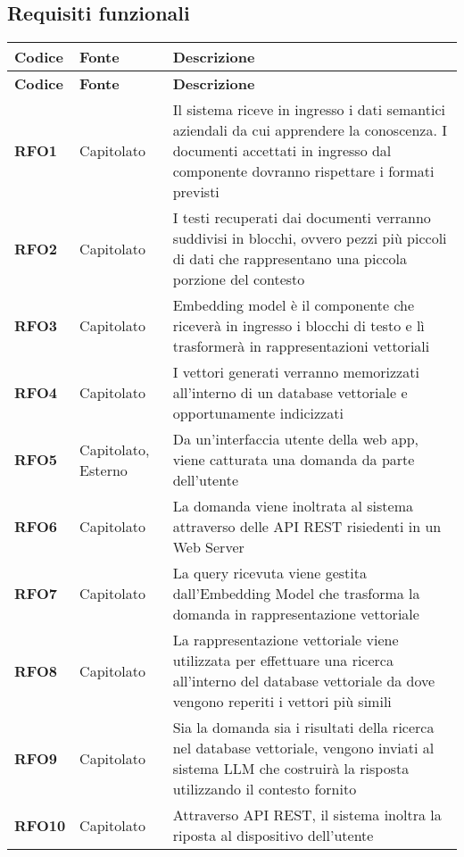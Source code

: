 \subsection{Requisiti funzionali}
\begin{longtable}{|>{\centering\arraybackslash}m{}|>{\centering\arraybackslash}m{}|>{\arraybackslash}m{}|}
	\hline
	\textbf{Codice} & \textbf{Fonte} & \textbf{Descrizione}\\\hline
	\endfirsthead
	\hline
	\textbf{Codice} & \textbf{Fonte} & \textbf{Descrizione}\\\hline
	\endhead
	\hline
	\textbf{RFO1}            & Capitolato    & Il sistema riceve in ingresso i dati semantici aziendali da cui apprendere la conoscenza. I documenti accettati in ingresso dal componente dovranno rispettare i formati previsti \\
	\hline
	\textbf{RFO2} & Capitolato & I testi recuperati dai documenti verranno suddivisi in blocchi, ovvero pezzi più piccoli di dati che rappresentano una piccola porzione del contesto\\
	\hline
	\textbf{RFO3} & Capitolato & Embedding model è il componente che riceverà in ingresso i blocchi di testo e lì trasformerà in rappresentazioni vettoriali\\
	\hline
	\textbf{RFO4} & Capitolato & I vettori generati verranno memorizzati all’interno di un database vettoriale e opportunamente indicizzati\\
	\hline
	\textbf{RFO5} & Capitolato, Esterno & Da un’interfaccia utente della web app, viene catturata una domanda da parte dell’utente\\
	\hline
	\textbf{RFO6} & Capitolato & La domanda viene inoltrata al sistema attraverso delle API REST risiedenti in un Web Server\\
	\hline
	\textbf{RFO7} & Capitolato & La query ricevuta viene gestita dall’Embedding Model che trasforma la domanda in rappresentazione vettoriale \\
	\hline
	\textbf{RFO8} & Capitolato & La rappresentazione vettoriale viene utilizzata per effettuare una ricerca all’interno del database vettoriale da dove vengono reperiti i vettori più simili\\
	\hline
	\textbf{RFO9} & Capitolato & Sia la domanda sia i risultati della ricerca nel database vettoriale, vengono inviati al sistema LLM che costruirà la risposta utilizzando il contesto fornito\\
	\hline
	\textbf{RFO10} & Capitolato & Attraverso API REST, il sistema inoltra la riposta al dispositivo dell’utente\\

\end{longtable}
